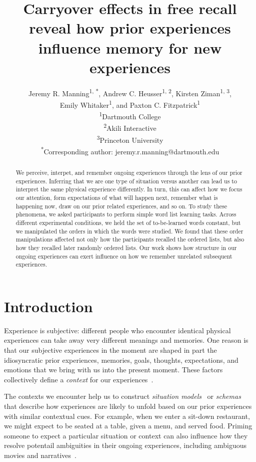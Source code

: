 \documentclass[10pt]{article}
\title{Carryover effects in free recall reveal how prior experiences influence memory for new experiences}
\author{Jeremy R. Manning\textsuperscript{1, *}, Andrew C. Heusser\textsuperscript{1, 2}, Kirsten Ziman\textsuperscript{1, 3},\\Emily Whitaker\textsuperscript{1}, and Paxton C. Fitzpatrick\textsuperscript{1}\\\textsuperscript{1}Dartmouth College\\\textsuperscript{2}Akili Interactive\\\textsuperscript{3}Princeton University\\\textsuperscript{*}Corresponding author: jeremy.r.manning@dartmouth.edu}
\date{}
\begin{document}
\maketitle

\begin{abstract}
We perceive, interpet, and remember ongoing experiences through the lens of our prior experiences.
Inferring that we are one type of situation versus another can lead us to interpret the same physical
experience differently.  In turn, this can affect how we focus our attention, form expectations of what will happen next, 
remember what is happening now, draw on our prior related experiences, and so on.  To study these phenomena,
we asked participants to perform simple word list learning tasks.  Across different experimental conditions, we held the set of
to-be-learned words constant, but we manipulated the orders in which the words were studied.  We found that 
these order manipulations affected not only how the participants recalled the ordered lists, but also how they recalled later randomly
ordered lists.  Our work shows how structure in our ongoing experiences can exert influence on how we remember unrelated
subsequent experiences.
\end{abstract}


\section*{Introduction}

Experience is subjective: different people who encounter identical physical experiences
can take away very different meanings and memories.  One reason is that our subjective
experiences in the moment are shaped in part the idiosyncratic prior experiences, memories,
goals, thoughts, expectations, and emotions that we bring with us into the present moment.
These factors collectively define a \textit{context} for our experiences~\citep{Mann20}.

The contexts we encounter help us to construct \textit{situation models}~\citep{RangRitc12, MannEtal15}
or \textit{schemas}~\citep{MasiEtal22, BaldEtal18} that describe how experiences are likely to unfold
based on our prior experiences with similar contextual cues.  For example, when we enter a sit-down restaurant,
we might expect to be seated at a table, given a menu, and served food.  Priming someone
to expect a particular situation or context can also influence how they resolve potentail ambiguities
in their ongoing experiences, including ambiguous movies and narratives~\citep{YeshEtal17}.
\end{document}
